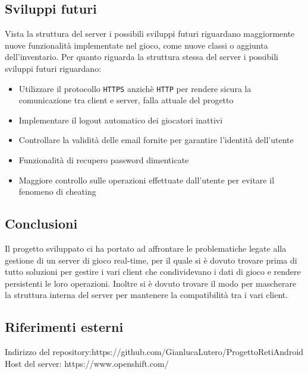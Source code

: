 \documentclass[12pt,a4]{article}
\begin{document}
\subsection{Sviluppi futuri}
Vista la struttura del server i possibili sviluppi futuri riguardano maggiormente nuove funzionalità implementate nel gioco, come nuove classi o aggiunta dell'inventario. Per quanto riguarda la struttura stessa del server i possibili sviluppi futuri riguardano:
\begin{itemize}
\item Utilizzare il protocollo \texttt{HTTPS} anzichè \texttt{HTTP} per rendere sicura la comunicazione tra client e server, falla attuale del progetto

\item Implementare il logout automatico dei giocatori inattivi
 
\item Controllare la validità delle email fornite per garantire l'identità dell'utente

\item Funzionalità di recupero password dimenticate

\item Maggiore controllo sulle operazioni effettuate dall'utente per evitare il fenomeno di cheating 
\end{itemize} 


\subsection{Conclusioni}
Il progetto sviluppato ci ha portato ad affrontare le problematiche legate alla gestione di un server di gioco real-time, per il quale si è dovuto trovare prima di tutto soluzioni per gestire i vari client che condividevano i dati di gioco e rendere persistenti le loro operazioni. Inoltre si è dovuto trovare il modo per mascherare la struttura interna del server per mantenere la compatibilità tra i vari client.

\subsection{Riferimenti esterni}
Indirizzo del repository:https://github.com/GianlucaLutero/ProgettoRetiAndroid
Host del server: https://www.openshift.com/
\end{document}

